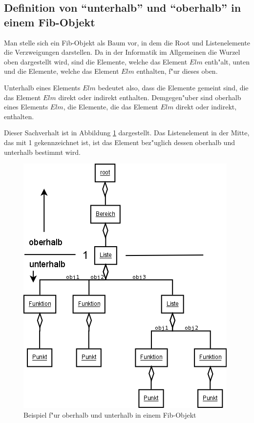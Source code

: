 \subsection{Definition von ``unterhalb'' und ``oberhalb'' in einem Fib-Objekt}
\label{secDefinitionUpDown}

Man stelle sich ein Fib-Objekt als Baum vor, in dem die Root und Listenelemente die Verzweigungen darstellen.
Da in der Informatik im Allgemeinen die Wurzel oben dargestellt wird, sind die Elemente, welche das Element $Elm$ enth"alt, unten und die Elemente, welche das Element $Elm$ enthalten, f"ur dieses oben.

Unterhalb eines Elements $Elm$ bedeutet also, dass die Elemente gemeint sind, die das Element $Elm$ direkt oder indirekt enthalten.
Demgegen"uber sind oberhalb eines Elements $Elm$, die Elemente, die das Element $Elm$ direkt oder indirekt, enthalten.

Dieser Sachverhalt ist in Abbildung \ref{figDirectionFibElements} dargestellt. Das Listenelement in der Mitte, das mit 1 gekennzeichnet ist, ist das Element bez"uglich dessen oberhalb und unterhalb bestimmt wird.

\begin{figure}[htbp]
\begin{center}
  \includegraphics[scale=0.5]{oberhalb_unterhalb}
\end{center}
\caption{Beispiel f"ur oberhalb und unterhalb in einem Fib-Objekt}
\label{figDirectionFibElements}
\end{figure}


